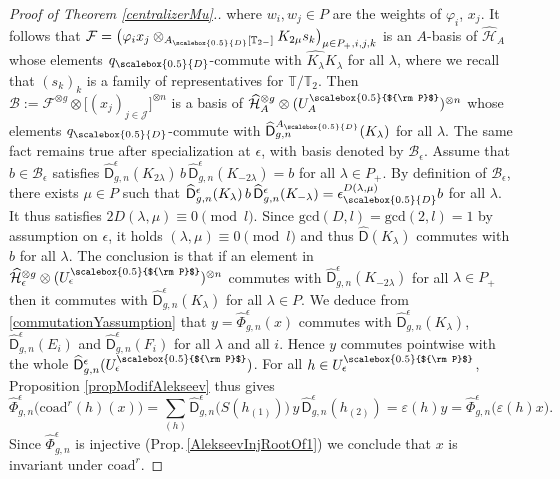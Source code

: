 \documentclass[11pt]{amsart}
\newcommand{\e}{\epsilon}
\newcommand{\qD}{q_{\scalebox{0.5}{D}}}
\newcommand{\eD}{\epsilon_{\scalebox{0.5}{D}}}
\newcommand{\AD}{A_{\scalebox{0.5}{D}}}
\newcommand{\Pup}{{\scalebox{0.5}{${\rm P}$}}}
\begin{document}
\begin{proof}[Proof of Theorem \ref{centralizerMu}.]
where $w_i,w_j \in P$ are the weights of $\varphi_i$, $x_j$. It follows that $\mathcal{F} = \bigl( \varphi_i x_j \otimes_{\AD[\mathbb{T}_{2-}]} K_{2\mu}s_k \bigr)_{\mu \in P_+, i,j,k}$ is an $A$-basis of $\widehat{\mathcal{H}}_A$ whose elements $\qD$-commute with $\widehat{K_{\lambda}}K_{\lambda}$ for all $\lambda$, where we recall that $(s_k)_k$ is a family of representatives for $\mathbb{T}/\mathbb{T}_2$. Then $\mathcal{B} := \mathcal{F}^{\otimes g} \otimes \bigl[(x_j)_{j \in \mathcal{J}}\bigr]^{\otimes n}$ is a basis of $\widehat{\mathcal{H}}_A^{\otimes g} \otimes (U_A^\Pup)^{\otimes n}$ whose elements $\qD$-commute with $\widehat{\mathsf{D}}^{\AD}_{g,n}(K_{\lambda})$ for all $\lambda$. The same fact remains true after specialization at $\e$, with basis denoted by $\mathcal{B}_\e$. Assume that $b \in \mathcal{B}_\e$ satisfies $\widehat{\mathsf{D}}^{\e}_{g,n}(K_{2\lambda})\,b\,\widehat{\mathsf{D}}^{\e}_{g,n}(K_{-2\lambda}) = b$ for all $\lambda \in P_+$. By definition of $\mathcal{B}_\e$, there exists $\mu \in P$ such that $\widehat{\mathsf{D}}^{\e}_{g,n}(K_{\lambda})\,b\,\widehat{\mathsf{D}}^{\e}_{g,n}(K_{-\lambda}) = \eD^{D(\lambda,\mu)}b$ for all $\lambda$. It thus satisfies $2D(\lambda,\mu) \equiv 0 \pmod{l}$. Since $\mathrm{gcd}(D,l) = \mathrm{gcd}(2,l) = 1$ by assumption on $\e$, it holds $(\lambda,\mu) \equiv 0 \pmod{l}$ and thus $\widehat{\mathsf{D}}(K_{\lambda})$ commutes with $b$ for all $\lambda$. The conclusion is that if an element in $\widehat{\mathcal{H}}_\e^{\otimes g} \otimes (U_\e^\Pup)^{\otimes n}$ commutes with $\widehat{\mathsf{D}}^{\e}_{g,n}(K_{-2\lambda})$ for all $\lambda\in P_+$ then it commutes with $\widehat{\mathsf{D}}^{\e}_{g,n}(K_{\lambda})$ for all $\lambda\in P$. We deduce from \eqref{commutationYassumption} that $y = \widehat{\Phi}_{g,n}^{\e}(x)$ commutes with $\widehat{\mathsf{D}}_{g,n}^{\e}(K_{\lambda})$, $\widehat{\mathsf{D}}^{\e}_{g,n}(E_i)$ and $\widehat{\mathsf{D}}^{\e}_{g,n}(F_i)$ for all $\lambda$ and all $i$. Hence $y$ commutes pointwise with the whole $\widehat{\mathsf{D}}^{\e}_{g,n}(U_\e^\Pup)$. For all $h \in U_\e^\Pup$, Proposition \ref{propModifAlekseev} thus gives
\[ \widehat{\Phi}_{g,n}^{\e}\bigl( \mathrm{coad}^r(h)(x) \bigr) = \sum_{(h)} \widehat{\mathsf{D}}^{\e}_{g,n}\bigl( S(h_{(1)}) \bigr) \, y \, \widehat{\mathsf{D}}^{\e}_{g,n}(h_{(2)}) = \varepsilon(h)y = \widehat{\Phi}_{g,n}^{\e}\bigl( \varepsilon(h)x \bigr). \]
Since $\widehat{\Phi}_{g,n}^{\e}$ is injective (Prop.\,\ref{AlekseevInjRootOf1}) we conclude that $x$ is invariant under $\mathrm{coad}^r$.
\end{proof}
\end{document}
